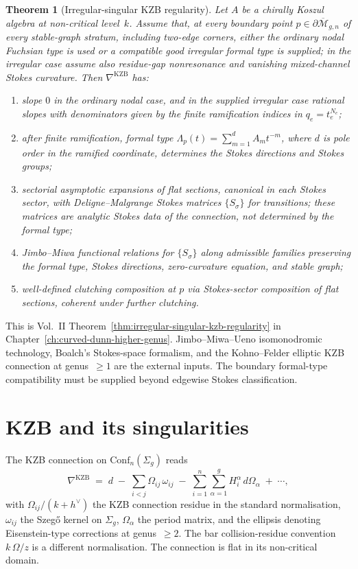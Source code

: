 \documentclass[11pt]{amsart}
\newtheorem{theorem}{Theorem}[section]
\theoremstyle{definition}
\theoremstyle{remark}
\providecommand{\Mbar}{\overline{\mathcal{M}}}
\providecommand{\Conf}{\mathrm{Conf}}
\providecommand{\KZB}{\mathrm{KZB}}
\begin{document}
\begin{theorem}[Irregular-singular KZB regularity]
\label{thm:irregular-singular-kzb-standalone}
Let $A$ be a chirally Koszul algebra at non-critical level~$k$.
Assume that, at every boundary point
$p \in \partial\Mbar_{g,n}$ of every stable-graph stratum, including
two-edge corners, either the ordinary nodal Fuchsian type is used or a
compatible good irregular formal type is supplied; in the irregular
case assume also residue-gap nonresonance and vanishing mixed-channel
Stokes curvature. Then
$\nabla^{\KZB}$ has:
\begin{enumerate}
\item slope \(0\) in the ordinary nodal case, and in the supplied
irregular case rational slopes with denominators given by the finite
ramification indices in \(q_e=t_e^{N_e}\);
\item after finite ramification, formal type
\(\Lambda_p(t)=\sum_{m=1}^d A_m t^{-m}\), where \(d\) is pole order
in the ramified coordinate, determines the Stokes directions and
Stokes groups;
\item sectorial asymptotic expansions of flat sections, canonical
in each Stokes sector, with Deligne--Malgrange Stokes matrices
\(\{S_\sigma\}\) for transitions; these matrices are analytic
Stokes data of the connection, not determined by the formal type;
\item Jimbo--Miwa functional relations for
$\{S_\sigma\}$ along admissible families preserving the formal type,
Stokes directions, zero-curvature equation, and stable graph;
\item well-defined clutching composition at $p$ via Stokes-sector
composition of flat sections, coherent under further clutching.
\end{enumerate}
\end{theorem}

This is Vol.~II Theorem~\ref*{thm:irregular-singular-kzb-regularity}
in Chapter~\ref*{ch:curved-dunn-higher-genus}.
Jimbo--Miwa--Ueno isomonodromic technology, Boalch's Stokes-space
formalism, and the Kohno--Felder elliptic KZB connection at
genus~$\ge 1$ are the external inputs.  The boundary formal-type
compatibility must be supplied beyond edgewise Stokes classification.

\section{KZB and its singularities}

The KZB connection on $\Conf_n(\Sigma_g)$ reads
\[
\nabla^{\KZB}
\;=\; d
\;-\; \sum_{i<j} \Omega_{ij}\,\omega_{ij}
\;-\; \sum_{i=1}^{n}\sum_{\alpha=1}^{g} H_i^\alpha\,d\Omega_\alpha
\;+\; \cdots,
\]
with $\Omega_{ij}/(k+h^\vee)$ the KZB connection residue in the
standard normalisation,
$\omega_{ij}$ the Szeg\H{o} kernel on $\Sigma_g$, $\Omega_\alpha$ the
period matrix, and the ellipsis denoting Eisenstein-type corrections
at genus~$\ge 2$. The bar collision-residue convention
\(k\,\Omega/z\) is a different normalisation. The connection is flat
in its non-critical domain.
\end{document}
